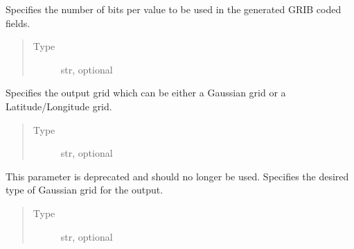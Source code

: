 \documentclass[letterpaper,10pt,english]{sphinxmanual}
\begin{document}
\begin{fulllineitems}
\begin{fulllineitems}
\end{fulllineitems}


\begin{fulllineitems}
\label{\detokenize{api:MarsRetrieval.MarsRetrieval.accuracy}}
Specifies the number of bits per value to be used in the
generated GRIB coded fields.
\begin{quote}\begin{description}
\item[{Type}] \leavevmode
str, optional

\end{description}\end{quote}

\end{fulllineitems}


\begin{fulllineitems}
\label{\detokenize{api:MarsRetrieval.MarsRetrieval.grid}}
Specifies the output grid which can be either a Gaussian grid
or a Latitude/Longitude grid.
\begin{quote}\begin{description}
\item[{Type}] \leavevmode
str, optional

\end{description}\end{quote}

\end{fulllineitems}


\begin{fulllineitems}
\label{\detokenize{api:MarsRetrieval.MarsRetrieval.gaussian}}
This parameter is deprecated and should no longer be used.
Specifies the desired type of Gaussian grid for the output.
\begin{quote}\begin{description}
\item[{Type}] \leavevmode
str, optional


\end{description}
\end{quote}
\end{fulllineitems}
\end{fulllineitems}
\end{document}
